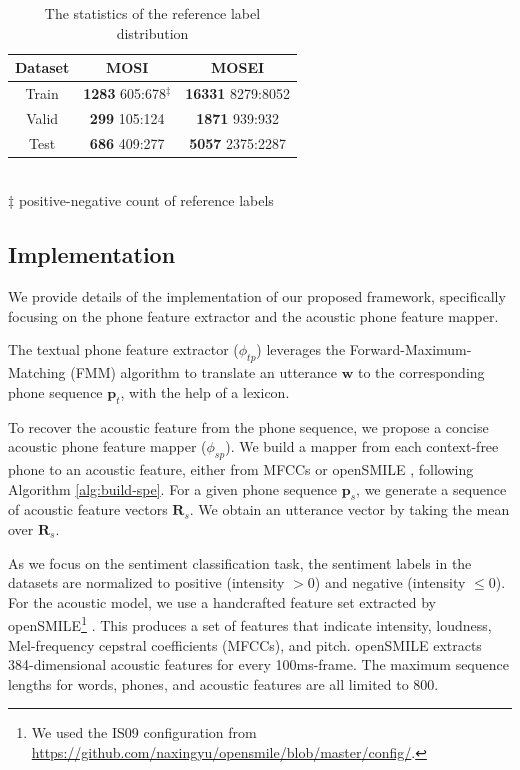 \documentclass[11pt]{article}
\begin{document}
\begin{table}[!htp]
\centering
\small
\caption{The statistics of the reference label distribution}%
\begin{tabular}{c|c|c}
\toprule
\textbf{Dataset} & \textbf{MOSI} & \textbf{MOSEI} \\
\midrule
Train & {\textbf{1283} 605:678$^\ddag$} & {\textbf{16331} 8279:8052} \\
Valid & {\textbf{299} 105:124} & {\small \textbf{1871} 939:932}   \\
Test & {\textbf{686} 409:277} & {\small \textbf{5057} 2375:2287} \\
\bottomrule
\end{tabular}
\label{tab:data}
\\{\normalsize $\ddag$ positive-negative count of reference labels}
\end{table}

\subsection{Implementation}
\label{sec:imp}

We provide details of the implementation of our proposed framework, specifically focusing on the phone feature extractor and the acoustic phone feature mapper.

The textual phone feature extractor ($\phi_{tp}$) leverages the Forward-Maximum-Matching (FMM) algorithm to translate an utterance $\mathbf{w}$ to the corresponding phone sequence $\mathbf{p}_t$, with the help of a lexicon.

To recover the acoustic feature from the phone sequence, we propose a concise acoustic phone feature mapper ($\phi_{sp}$). We build a mapper from each context-free phone to an acoustic feature, either from MFCCs or openSMILE \cite{Xueyang-eyben2010opensmile}, following Algorithm \ref{alg:build-spe}. For a given phone sequence $\mathbf{p}_s$, we generate a sequence of acoustic feature vectors $\mathbf{R}_s$. We obtain an utterance vector by taking the mean over $\mathbf{R}_s$.

As we focus on the sentiment classification task, the sentiment labels in the datasets are normalized to positive (intensity $>0$) and negative (intensity $\leq0$). For the acoustic model, we use a handcrafted feature set extracted by openSMILE\footnote{We used the IS09 configuration from \url{https://github.com/naxingyu/opensmile/blob/master/config/}.} \cite{Xueyang-eyben2010opensmile}. This produces a set of features that indicate intensity, loudness, Mel-frequency cepstral coefficients (MFCCs), and pitch. openSMILE extracts 384-dimensional acoustic features for every 100ms-frame. The maximum sequence lengths for words, phones, and acoustic features are all limited to 800.
\end{document}
